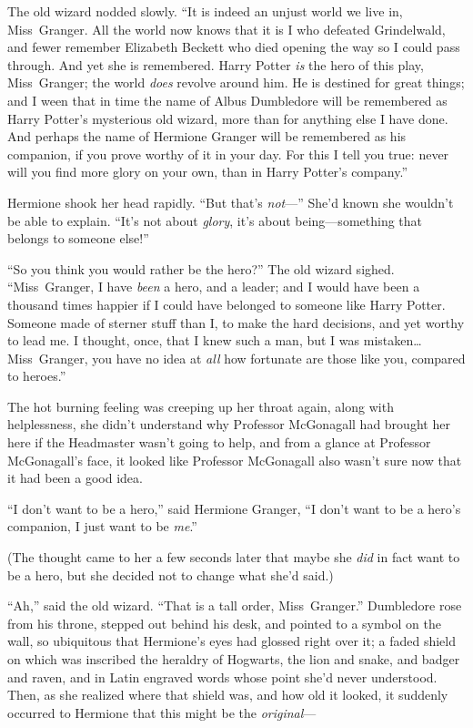 The old wizard nodded slowly. “It is indeed an unjust world we live in, Miss~Granger. All the world now knows that it is I who defeated Grindelwald, and fewer remember Elizabeth Beckett who died opening the way so I could pass through. And yet she is remembered. Harry Potter \emph{is} the hero of this play, Miss~Granger; the world \emph{does} revolve around him. He is destined for great things; and I ween that in time the name of Albus Dumbledore will be remembered as Harry Potter’s mysterious old wizard, more than for anything else I have done. And perhaps the name of Hermione Granger will be remembered as his companion, if you prove worthy of it in your day. For this I tell you true: never will you find more glory on your own, than in Harry Potter’s company.”

Hermione shook her head rapidly. “But that’s \emph{not}—” She’d known she wouldn’t be able to explain. “It’s not about \emph{glory}, it’s about being—something that belongs to someone else!”

“So you think you would rather be the hero?” The old wizard sighed. “Miss~Granger, I have \emph{been} a hero, and a leader; and I would have been a thousand times happier if I could have belonged to someone like Harry Potter. Someone made of sterner stuff than I, to make the hard decisions, and yet worthy to lead me. I thought, once, that I knew such a man, but I was mistaken…Miss~Granger, you have no idea at \emph{all} how fortunate are those like you, compared to heroes.”

The hot burning feeling was creeping up her throat again, along with helplessness, she didn’t understand why Professor McGonagall had brought her here if the Headmaster wasn’t going to help, and from a glance at Professor McGonagall’s face, it looked like Professor McGonagall also wasn’t sure now that it had been a good idea.

“I don’t want to be a hero,” said Hermione Granger, “I don’t want to be a hero’s companion, I just want to be \emph{me}.”

(The thought came to her a few seconds later that maybe she \emph{did} in fact want to be a hero, but she decided not to change what she’d said.)

“Ah,” said the old wizard. “That is a tall order, Miss~Granger.” Dumbledore rose from his throne, stepped out behind his desk, and pointed to a symbol on the wall, so ubiquitous that Hermione’s eyes had glossed right over it; a faded shield on which was inscribed the heraldry of Hogwarts, the lion and snake, and badger and raven, and in Latin engraved words whose point she’d never understood. Then, as she realized where that shield was, and how old it looked, it suddenly occurred to Hermione that this might be the \emph{original}—

